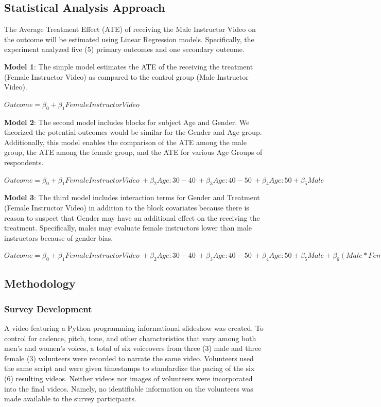 \documentclass[
]{article}
\begin{document}
\hypertarget{statistical-analysis-approach}{%
\subsection{Statistical Analysis
Approach}\label{statistical-analysis-approach}}

The Average Treatment Effect (ATE) of receiving the Male Instructor
Video on the outcome will be estimated using Linear Regression models.
Specifically, the experiment analyzed five (5) primary outcomes and one
secondary outcome.

\textbf{Model 1}: The simple model estimates the ATE of the receiving
the treatment (Female Instructor Video) as compared to the control group
(Male Instructor Video).

\(Outcome=\beta_0+\beta_1 Female Instructor Video\)

\textbf{Model 2}: The second model includes blocks for subject Age and
Gender. We theorized the potential outcomes would be similar for the
Gender and Age group. Additionally, this model enables the comparison of
the ATE among the male group, the ATE among the female group, and the
ATE for various Age Groups of respondents.

\(Outcome=\beta_0+\beta_1 Female Instructor Video \ +\beta_2Age:30-40\ +\beta_3Age:40-50\ +\beta_4Age:50+\beta_5Male\)

\textbf{Model 3}: The third model includes interaction terms for Gender
and Treatment (Female Instructor Video) in addition to the block
covariates because there is reason to suspect that Gender may have an
additional effect on the receiving the treatment. Specifically, males
may evaluate female instructors lower than male instructors because of
gender bias.

\(Outcome=\beta_0+\beta_1 Female Instructor Video \ +\beta_2Age:30-40\ +\beta_3Age:40-50\ +\beta_4Age:50+\beta_5Male +\beta_6(Male*FemaleInstructorVideo)\)

\hypertarget{methodology}{%
\subsection{Methodology}\label{methodology}}

\hypertarget{survey-development}{%
\subsubsection{Survey Development}\label{survey-development}}

A video featuring a Python programming informational slideshow was
created. To control for cadence, pitch, tone, and other characteristics
that vary among both men's and women's voices, a total of six voiceovers
from three (3) male and three female (3) volunteers were recorded to
narrate the same video. Volunteers used the same script and were given
timestamps to standardize the pacing of the six (6) resulting videos.
Neither videos nor images of volunteers were incorporated into the final
videos. Namely, no identifiable information on the volunteers was made
available to the survey participants.
\end{document}
